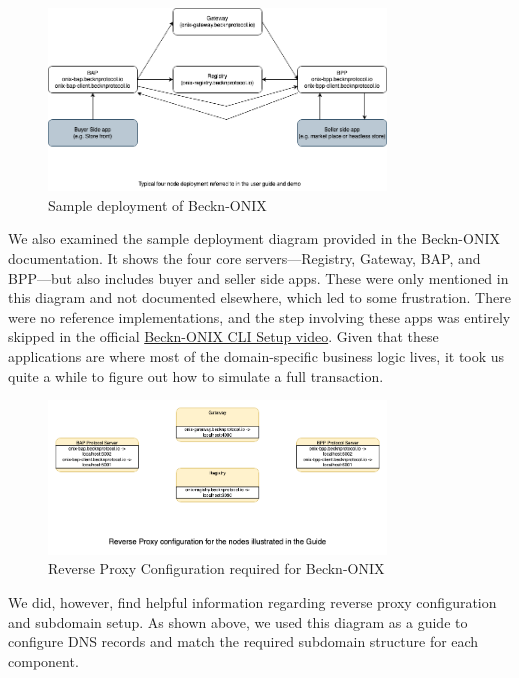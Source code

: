 \begin{figure}[h!]
\centering
\includegraphics[width=0.8\textwidth]{Images/sample_deployment.png}
\caption{Sample deployment of Beckn-ONIX}
\label{fig:sample_deployment}
\end{figure}

We also examined the sample deployment diagram provided in the Beckn-ONIX documentation. It shows the four core servers—Registry, Gateway, BAP, and BPP—but also includes buyer and seller side apps. These were only mentioned in this diagram and not documented elsewhere, which led to some frustration. There were no reference implementations, and the step involving these apps was entirely skipped in the official \href{https://drive.google.com/file/d/1PfdhIpq-Qo6sDy0wAnO0zllCMGX718FW/view}{Beckn-ONIX CLI Setup video}. Given that these applications are where most of the domain-specific business logic lives, it took us quite a while to figure out how to simulate a full transaction.\newpage

\begin{figure}[h]
\centering
\includegraphics[width=0.8\textwidth]{Images/reverse_proxy_configuration.png}
\caption{Reverse Proxy Configuration required for Beckn-ONIX}
\label{fig:reverse_proxy_config}
\end{figure}

We did, however, find helpful information regarding reverse proxy configuration and subdomain setup. As shown above, we used this diagram as a guide to configure DNS records and match the required subdomain structure for each component.